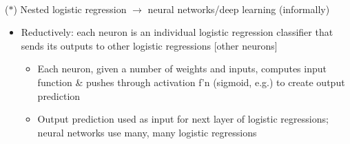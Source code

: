 \documentclass[12pt]{extarticle}
\theoremstyle{definition}
\theoremstyle{remark}
\newcommand{\pstart}[0]{\noindent}
\newcommand{\newp}[0]{~\\ \pstart}
\newcommand{\prob}[1]{\text{Pr}(#1)}
\newcommand{\cond}[2]{#1\,\vert\,#2}
\begin{document}
\iffalse
\newp
Logistic regression similar to Naive Bayes \begin{itemize}
    \item Naive Bayes: Assume $\prob{XY}=\prob{X}\prod_i\prob{\cond{X_i}{Y}}$
    \item If two possible values [0 and 1] for $Y$, $\prob{\cond{Y=1}{X}}=\frac{\prob{Y=1,X}}{\prob{X}}=\frac{\prob{Y=1,X}}{\prob{Y=1,X}+\prob{Y=0,X}}$

    $=\frac{1}{1+\frac{\prob{Y=0,X}}{\prob{Y=1,X}}}=\frac{1}{1+\exp\log\frac{\prob{Y=0}\prod_i\prob{\cond{X_i}{Y=0}}}{\prob{Y=1}\prod_i\prob{\cond{X_i}{Y=1}}}}=\frac{1}{1+\exp(\log\frac{\prob{Y=0}}{\prob{Y=1}}+\sum_i\log\frac{\prob{\cond{X_i}{Y=0}}}{\prob{\cond{X_i}{Y=1}}})}$

    $=\frac{1}{1+\exp(w_0+\sum_iw_ix_i)}$
\end{itemize}
\fi

\newp
($\ast$) Nested logistic regression $\to$ neural networks/deep learning (informally) \begin{itemize}
    \item Reductively: each neuron is an individual logistic regression classifier that sends its outputs to other logistic regressions [other neurons] \begin{itemize}
        \item Each neuron, given a number of weights and inputs, computes input function \& pushes through activation f'n (sigmoid, e.g.) to create output prediction
        \item Output prediction used as input for next layer of logistic regressions; neural networks use many, many logistic regressions
    \end{itemize}
\end{itemize}
\end{document}
